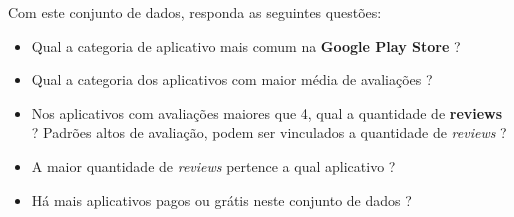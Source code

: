 \documentclass[12pt]{article}
\begin{document}
Com este conjunto de dados, responda as seguintes questões:

\begin{itemize}
    \item Qual a categoria de aplicativo mais comum na \textbf{Google Play Store} ?
    \item Qual a categoria dos aplicativos com maior média de avaliações ?
    \item Nos aplicativos com avaliações maiores que 4, qual a quantidade de \textbf{reviews} ? Padrões altos de avaliação, podem ser vinculados a quantidade de \textit{reviews} ?
    \item A maior quantidade de \textit{reviews} pertence a qual aplicativo ?
    \item Há mais aplicativos pagos ou grátis neste conjunto de dados ?
\end{itemize}



% 
% 
\end{document}
